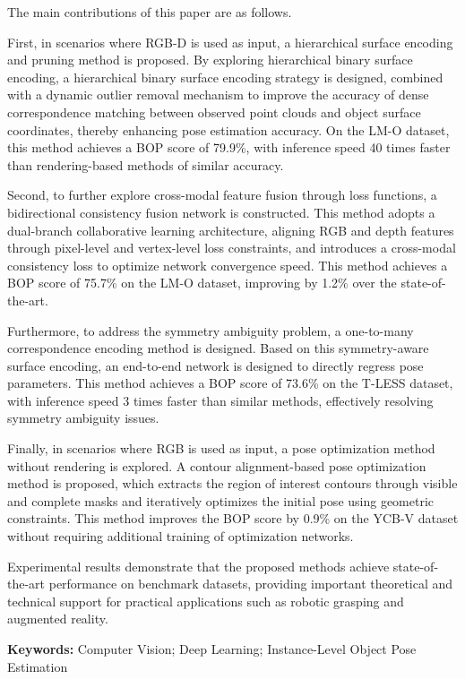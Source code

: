 \par The main contributions of this paper are as follows.
\par First, in scenarios where RGB-D is used as input, a hierarchical surface encoding and pruning method is proposed. By exploring hierarchical binary surface encoding, a hierarchical binary surface encoding strategy is designed, combined with a dynamic outlier removal mechanism to improve the accuracy of dense correspondence matching between observed point clouds and object surface coordinates, thereby enhancing pose estimation accuracy. On the LM-O dataset, this method achieves a BOP score of 79.9\%, with inference speed 40 times faster than rendering-based methods of similar accuracy.
\par Second, to further explore cross-modal feature fusion through loss functions, a bidirectional consistency fusion network is constructed. This method adopts a dual-branch collaborative learning architecture, aligning RGB and depth features through pixel-level and vertex-level loss constraints, and introduces a cross-modal consistency loss to optimize network convergence speed. This method achieves a BOP score of 75.7\% on the LM-O dataset, improving by 1.2\% over the state-of-the-art.
\par Furthermore, to address the symmetry ambiguity problem, a one-to-many correspondence encoding method is designed. Based on this symmetry-aware surface encoding, an end-to-end network is designed to directly regress pose parameters. This method achieves a BOP score of 73.6\% on the T-LESS dataset, with inference speed 3 times faster than similar methods, effectively resolving symmetry ambiguity issues.
\par Finally, in scenarios where RGB is used as input, a pose optimization method without rendering is explored. A contour alignment-based pose optimization method is proposed, which extracts the region of interest contours through visible and complete masks and iteratively optimizes the initial pose using geometric constraints. This method improves the BOP score by 0.9\% on the YCB-V dataset without requiring additional training of optimization networks.
\par Experimental results demonstrate that the proposed methods achieve state-of-the-art performance on benchmark datasets, providing important theoretical and technical support for practical applications such as robotic grasping and augmented reality.
\par \textbf{Keywords:} Computer Vision; Deep Learning; Instance-Level Object Pose Estimation